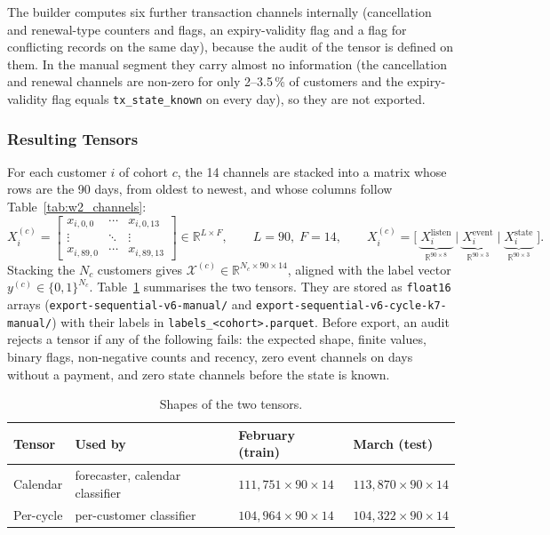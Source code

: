 \documentclass{article}
\newcommand{\R}{\mathbb{R}}
\begin{document}
The builder computes six further transaction channels internally (cancellation and renewal-type counters and flags, an expiry-validity flag and a flag for conflicting records on the same day), because the audit of the tensor is defined on them. In the manual segment they carry almost no information (the cancellation and renewal channels are non-zero for only 2--3.5\,\% of customers and the expiry-validity flag equals \texttt{tx\_state\_known} on every day), so they are not exported.

\subsubsection{Resulting Tensors}

For each customer $i$ of cohort $c$, the 14 channels are stacked into a matrix whose rows are the 90 days, from oldest to newest, and whose columns follow Table~\ref{tab:w2_channels}:
\begin{equation}
X_i^{(c)} =
\begin{bmatrix}
x_{i,0,0}  & \cdots & x_{i,0,13} \\
\vdots     & \ddots & \vdots \\
x_{i,89,0} & \cdots & x_{i,89,13}
\end{bmatrix}
\in \R^{L \times F}, \qquad L = 90,\; F = 14 ,
\qquad
X_i^{(c)} = \big[\; \underbrace{X_i^{\text{listen}}}_{\R^{90 \times 8}} \;\big|\; \underbrace{X_i^{\text{event}}}_{\R^{90 \times 3}} \;\big|\; \underbrace{X_i^{\text{state}}}_{\R^{90 \times 3}} \;\big].
\end{equation}
Stacking the $N_c$ customers gives $\mathcal{X}^{(c)} \in \R^{N_c \times 90 \times 14}$, aligned with the label vector $y^{(c)} \in \{0,1\}^{N_c}$. Table~\ref{tab:w2_tensors} summarises the two tensors. They are stored as \texttt{float16} arrays (\texttt{export-sequential-v6-manual/} and \texttt{export-sequential-v6-cycle-k7-manual/}) with their labels in \texttt{labels\_<cohort>.parquet}. Before export, an audit rejects a tensor if any of the following fails: the expected shape, finite values, binary flags, non-negative counts and recency, zero event channels on days without a payment, and zero state channels before the state is known.

\begin{table}[H]
\centering
\renewcommand{\arraystretch}{1.3}
\begin{tabular}{|l|l|l|l|}
\hline
\textbf{Tensor} & \textbf{Used by} & \textbf{February (train)} & \textbf{March (test)} \\ \hline
Calendar  & forecaster, calendar classifier & $111{,}751 \times 90 \times 14$ & $113{,}870 \times 90 \times 14$ \\ \hline
Per-cycle & per-customer classifier & $104{,}964 \times 90 \times 14$ & $104{,}322 \times 90 \times 14$ \\ \hline
\end{tabular}
\caption{Shapes of the two tensors.}
\label{tab:w2_tensors}
\end{table}
\end{document}
